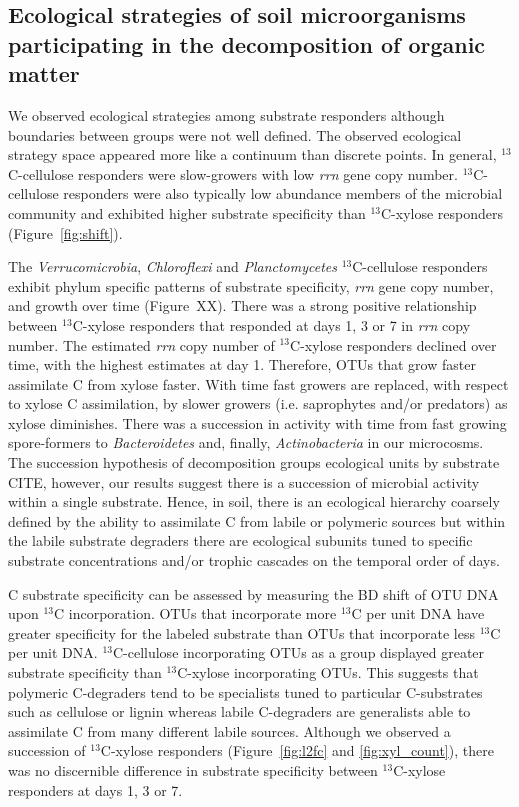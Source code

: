 \subsection{Ecological strategies of soil microorganisms participating in the
decomposition of organic matter}
We observed ecological strategies among substrate responders although
boundaries between groups were not well defined. The observed ecological
strategy space appeared more like a continuum than discrete points. In general,
$^{13}$C-cellulose responders were slow-growers with low \textit{rrn} gene copy
number. $^{13}$C-cellulose responders were also typically low abundance members
of the microbial community and exhibited higher substrate specificity than
$^{13}$C-xylose responders (Figure~\ref{fig:shift}). 

The \textit{Verrucomicrobia},
\textit{Chloroflexi} and \textit{Planctomycetes} $^{13}$C-cellulose responders exhibit 
phylum specific patterns of
substrate specificity, \textit{rrn} gene copy number, and growth over time (Figure~XX). There was a strong positive relationship between $^{13}$C-xylose
responders that responded at days 1,
3 or 7 in \textit{rrn} copy number. The estimated \textit{rrn} copy number of $^{13}$C-xylose responders declined over time, with the highest estimates at day 1. Therefore, OTUs that
grow faster assimilate C from xylose faster. With time fast growers
are replaced, with respect to xylose C assimilation, by slower growers (i.e. saprophytes and/or predators) as xylose diminishes. There was a succession in
activity with time from fast growing spore-formers to \textit{Bacteroidetes} and, finally, \textit{Actinobacteria} in our microcosms. The succession
hypothesis of decomposition groups ecological units by substrate CITE, however,
our results suggest there is a succession of microbial activity within
a single substrate. Hence, in soil, there is an ecological hierarchy coarsely
defined by the ability to assimilate C from labile or polymeric sources but
within the labile substrate degraders there are ecological subunits tuned to
specific substrate concentrations and/or trophic cascades on the temporal order
of days.

C substrate specificity can be assessed by measuring the BD shift of OTU DNA
upon $^{13}$C incorporation. OTUs that incorporate more $^{13}$C per unit DNA
have greater specificity for the labeled substrate than OTUs that incorporate
less $^{13}$C per unit DNA. $^{13}$C-cellulose incorporating OTUs as a group
displayed greater substrate specificity than $^{13}$C-xylose incorporating
OTUs. This suggests that polymeric C-degraders tend to be specialists tuned to
particular C-substrates such as cellulose or lignin whereas labile C-degraders
are generalists able to assimilate C from many different labile sources.
Although we observed a succession of $^{13}$C-xylose responders
(Figure~\ref{fig:l2fc} and \ref{fig:xyl_count}), there was no discernible
difference in substrate specificity between $^{13}$C-xylose responders at days 1, 3 or 7. 

